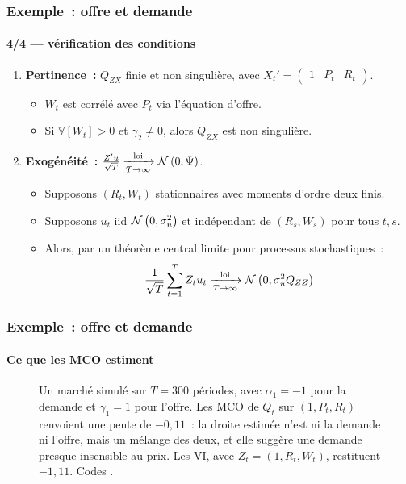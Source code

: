\documentclass[10pt]{beamer}
\begin{document}
\begin{frame}
  \frametitle{Exemple~: offre et demande}
  \framesubtitle{4/4 --- vérification des conditions}

  \begin{enumerate}

  \item \textbf{Pertinence~:} $Q_{ZX}$ finie et non singulière, avec
    $X_t' = \begin{pmatrix} 1 & P_t & R_t \end{pmatrix}$.
    \begin{itemize}
    \item $W_t$ est corrélé avec $P_t$ via l'équation d'offre.
    \item Si $\mathbb V[W_t] > 0$ et $\gamma_2 \neq 0$, alors $Q_{ZX}$ est non
      singulière.
    \end{itemize}

    \medskip

  \item \textbf{Exogénéité~:} $\frac{Z'u}{\sqrt{T}} \xrightarrow[T\rightarrow\infty]{\text{loi}} \mathcal N\left(0,\Psi\right)$.
    \begin{itemize}
    \item Supposons $(R_t, W_t)$ stationnaires avec moments d'ordre deux finis.
    \item Supposons $u_t$ iid $\mathcal N\left(0,\sigma_u^2\right)$ et indépendant
      de $(R_s, W_s)$ pour tous $t,s$.
    \item Alors, par un théorème central limite pour processus stochastiques~:
      \[ \frac{1}{\sqrt{T}}\sum_{t=1}^{T}Z_t u_t \xrightarrow[T\rightarrow\infty]{\text{loi}} \mathcal N\left(0,\sigma_u^2 Q_{ZZ}\right) \]
    \end{itemize}

  \end{enumerate}

\end{frame}


\begin{frame}[c]
  \frametitle{Exemple~: offre et demande}
  \framesubtitle{Ce que les MCO estiment}

  \begin{figure}
    \centering
    \scalebox{.42}{}
    \caption{Un marché simulé sur $T=300$ périodes, avec $\alpha_1=-1$ pour la
      demande et $\gamma_1=1$ pour l'offre. Les MCO de $Q_t$ sur $(1,P_t,R_t)$
      renvoient une pente de $-0{,}11$~: la droite estimée n'est ni la demande ni
      l'offre, mais un mélange des deux, et elle suggère une demande presque
      insensible au prix. Les VI, avec $Z_t=(1,R_t,W_t)$, restituent $-1{,}11$.
      Codes .}
  \end{figure}

\end{frame}
\end{document}
